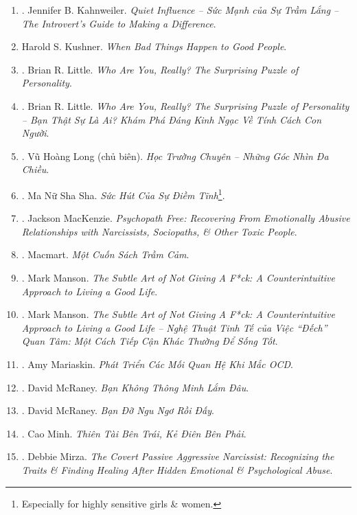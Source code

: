 \documentclass{article}
\begin{document}
\begin{enumerate}
	\item \cite{Kahnweiler2022}. Jennifer B. Kahnweiler. {\it Quiet Influence -- Sức Mạnh của Sự Trầm Lắng -- The Introvert's Guide to Making a Difference}.\hfill{\sf[done]}
	\item Harold S. Kushner. {\it When Bad Things Happen to Good People}.
	\item \cite{Little2017}. Brian R. Little. {\it Who Are You, Really? The Surprising Puzzle of Personality}.\hfill{\sf[done]}
	\item \cite{Little2023}. Brian R. Little. {\it Who Are You, Really? The Surprising Puzzle of Personality -- Bạn Thật Sự Là Ai? Khám Phá Đáng Kinh Ngạc Về Tính Cách Con Người}.\hfill{\sf[done]}
	\item \cite{Long2021}. Vũ Hoàng Long (chủ biên). {\it Học Trường Chuyên -- Những Góc Nhìn Đa Chiều}.\hfill{\sf[done]}
	\item \cite{MNSS_calm}. Ma Nữ Sha Sha. {\it Sức Hút Của Sự Điềm Tĩnh}\footnote{Especially for highly sensitive girls \& women.}.\hfill{\sf[done]}
	\item \cite{MacKenzie2015}. Jackson MacKenzie. {\it Psychopath Free: Recovering From Emotionally Abusive Relationships with Narcissists, Sociopaths, \& Other Toxic People}.\hfill{\sf[done]}
	\item \cite{Macmart_depress}. Macmart. {\it Một Cuốn Sách Trầm Cảm}.\hfill{\sf[reading]}
	\item \cite{Manson_giving_fuck}. Mark Manson. {\it The Subtle Art of Not Giving A F*ck: A Counterintuitive Approach to Living a Good Life}.\hfill{\sf[reading]}
	\item \cite{Manson_giving_fuck_vn}. Mark Manson. {\it The Subtle Art of Not Giving A F*ck: A Counterintuitive Approach to Living a Good Life -- Nghệ Thuật Tinh Tế của Việc ``Đếch'' Quan Tâm: Một Cách Tiếp Cận Khác Thường Để Sống Tốt}.\hfill{\sf[done]}
	\item \cite{Mariaskin_OCD}. Amy Mariaskin. {\it Phát Triển Các Mối Quan Hệ Khi Mắc OCD}.\hfill{\sf[done]}
	\item \cite{McRaney2022a}. David McRaney. {\it Bạn Không Thông Minh Lắm Đâu}.\hfill{\sf[done]}
	\item \cite{McRaney2022b}. David McRaney. {\it Bạn Đỡ Ngu Ngơ Rồi Đấy}.\hfill{\sf[done]}
	\item \cite{Minh2022}. Cao Minh. {\it Thiên Tài Bên Trái, Kẻ Điên Bên Phải}.\hfill{\sf[done]}
	\item \cite{Mirza2017}. Debbie Mirza. {\it The Covert Passive Aggressive Narcissist: Recognizing the Traits \& Finding Healing After Hidden Emotional \& Psychological Abuse}.\hfill{\sf[done]}

\end{enumerate}
\end{document}
